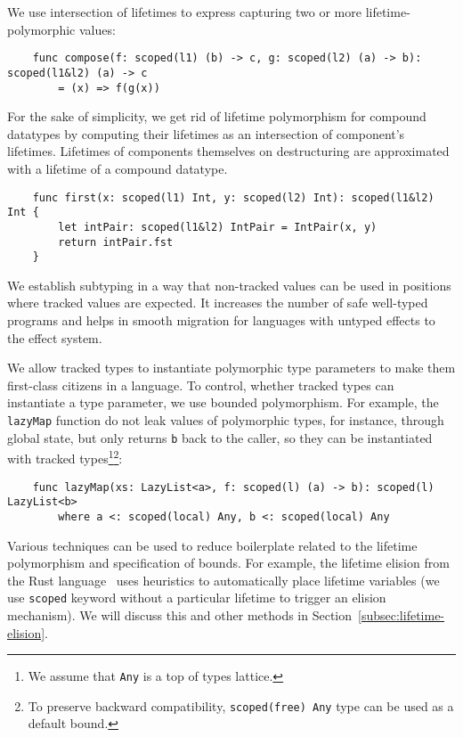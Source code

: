 \documentclass[acmsmall]{acmart}
\begin{document}
We use intersection of lifetimes to express capturing two or more lifetime-polymorphic values:
\begin{verbatim}
    func compose(f: scoped(l1) (b) -> c, g: scoped(l2) (a) -> b): scoped(l1&l2) (a) -> c
        = (x) => f(g(x))
\end{verbatim}

For the sake of simplicity, we get rid of lifetime polymorphism for compound datatypes by computing their lifetimes as an intersection of component's lifetimes.
Lifetimes of components themselves on destructuring are approximated with a lifetime of a compound datatype.
\begin{verbatim}
    func first(x: scoped(l1) Int, y: scoped(l2) Int): scoped(l1&l2) Int {
        let intPair: scoped(l1&l2) IntPair = IntPair(x, y)
        return intPair.fst
    }
\end{verbatim}

We establish subtyping in a way that non-tracked values can be used in positions where tracked values are expected.
It increases the number of safe well-typed programs and helps in smooth migration for languages with untyped effects to the effect system.

We allow tracked types to instantiate polymorphic type parameters to make them first-class citizens in a language.
To control, whether tracked types can instantiate a type parameter, we use bounded polymorphism.
For example, the \texttt{lazyMap} function do not leak values of polymorphic types, for instance, through global state, but only returns \texttt{b} back to the caller, so they can be instantiated with tracked types\footnote{We assume that \texttt{Any} is a top of types lattice.}\footnote{To preserve backward compatibility, \texttt{scoped(free) Any} type can be used as a default bound.}:
\begin{verbatim}
    func lazyMap(xs: LazyList<a>, f: scoped(l) (a) -> b): scoped(l) LazyList<b>
        where a <: scoped(local) Any, b <: scoped(local) Any
\end{verbatim}

Various techniques can be used to reduce boilerplate related to the lifetime polymorphism and specification of bounds.
For example, the lifetime elision from the Rust language~\cite{matsakis2014rust} uses heuristics to automatically place lifetime variables (we use \texttt{scoped} keyword without a particular lifetime to trigger an elision mechanism).
We will discuss this and other methods in Section~\ref{subsec:lifetime-elision}.
\end{document}
